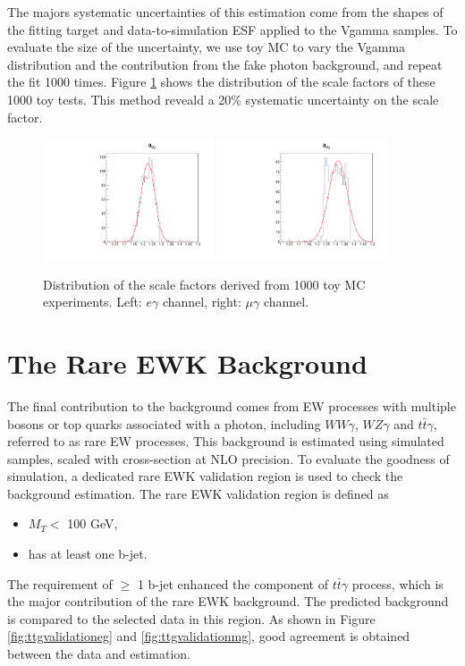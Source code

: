 \documentclass[thesis.tex]{subfiles}
\renewcommand\_{\textunderscore\allowbreak}
\begin{document}
The majors systematic uncertainties of this estimation come from the shapes of the fitting target and data-to-simulation ESF applied to the Vgamma samples. To evaluate the size of the uncertainty, we use toy MC to vary the Vgamma distribution and the contribution from the fake photon background, and 
repeat the fit 1000 times. Figure \ref{fig:dphisystematic} shows the distribution of the scale factors of these 1000 toy tests. This method reveald a 20\% systematic uncertainty on the scale factor.

\begin{figure}[hbtp]
  \centering
    \includegraphics[width=0.45\textwidth]{Figures/VGammaScale_eg.pdf}
    \includegraphics[width=0.45\textwidth]{Figures/VGammaScale_mg.pdf}
  \caption{Distribution of the scale factors derived from 1000 toy MC experiments. Left: $e\gamma$ channel, right: $\mu\gamma$ channel.}
    \label{fig:dphisystematic}
\end{figure}

\section{The Rare EWK Background}
The final contribution to the background comes from EW processes with multiple bosons or top quarks associated with a photon, including $WW\gamma$, $WZ\gamma$ and $t\bar{t}\gamma$, referred to as rare EW processes. 
This background is estimated using simulated samples, scaled with cross-section at NLO precision.
To evaluate the goodness of simulation, a dedicated rare EWK validation region is used to check the background estimation.
The rare EWK validation region is defined as
	\begin{itemize}
		\item $M_T <$ 100 GeV,
		\item has at least one b-jet.
	\end{itemize}
The requirement of $\ge$ 1 b-jet enhanced the component of $t\bar{t}\gamma$ process, which is the major contribution of the rare EWK background.
The predicted background is compared to the selected data in this region.
As shown in Figure \ref{fig:ttgvalidationeg} and \ref{fig:ttgvalidationmg}, good agreement is obtained between the data and estimation.
\end{document}
